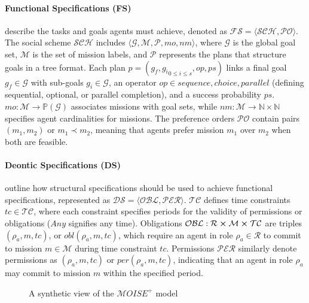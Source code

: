 \documentclass[sigconf,anonymous]{aamas}
\begin{document}
\noindent \paragraph{\textbf{Functional Specifications (FS)}} describe the tasks and goals agents must achieve, denoted as $\mathcal{FS} = \langle \mathcal{SCH}, \mathcal{PO} \rangle$. The social scheme $\mathcal{SCH}$ includes $\langle\mathcal{G}, \mathcal{M}, \mathcal{P}, mo, nm \rangle$, where $\mathcal{G}$ is the global goal set, $\mathcal{M}$ is the set of mission labels, and $\mathcal{P}$ represents the plans that structure goals in a tree format. Each plan $p = (g_f, {g_i}_{0 \leq i \leq s}, op, ps)$ links a final goal $g_f \in \mathcal{G}$ with sub-goals $g_i \in \mathcal{G}$, an operator $op \in {sequence, choice, parallel}$ (defining sequential, optional, or parallel completion), and a success probability $ps$. $mo: \mathcal{M} \rightarrow \mathbb{P}(\mathcal{G})$ associates missions with goal sets, while $nm: \mathcal{M} \rightarrow \mathbb{N} \times \mathbb{N}$ specifies agent cardinalities for missions. The preference orders $\mathcal{PO}$ contain pairs $(m_1, m_2)$ or $m_1 \prec m_2$, meaning that agents prefer mission $m_1$ over $m_2$ when both are feasible.

\noindent \paragraph{\textbf{Deontic Specifications (DS)}} outline how structural specifications should be used to achieve functional specifications, represented as $\mathcal{DS} = \langle \mathcal{OBL}, \mathcal{PER} \rangle$. $\mathcal{TC}$ defines time constraints $tc \in \mathcal{TC}$, where each constraint specifies periods for the validity of permissions or obligations ($Any$ signifies any time). Obligations $\mathcal{OBL}: \mathcal{R} \cross \mathcal{M} \cross \mathcal{TC}$ are triples $(\rho_a, m, tc)$, or $obl(\rho_a, m, tc)$, which require an agent in role $\rho_a \in \mathcal{R}$ to commit to mission $m \in \mathcal{M}$ during time constraint $tc$. Permissions $\mathcal{PER}$ similarly denote permissions as $(\rho_a, m, tc)$ or $per(\rho_a, m, tc)$, indicating that an agent in role $\rho_a$ may commit to mission $m$ within the specified period.

\begin{figure}[!]
    
    \caption{A synthetic view of the $\mathcal{M}OISE^+$ model}
    \label{fig:moise_model}
\end{figure}
\end{document}

